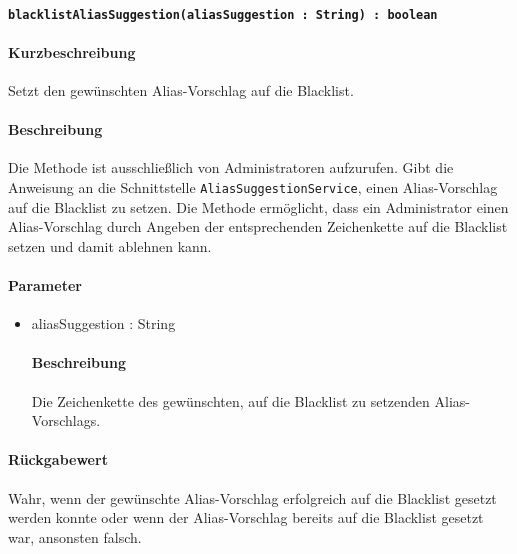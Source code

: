 \paragraph*{\texttt{blacklistAliasSuggestion(aliasSuggestion : String) : boolean}}%
\paragraph*{Kurzbeschreibung}
Setzt den gewünschten Alias-Vorschlag auf die Blacklist.
\paragraph*{Beschreibung}
Die Methode ist ausschließlich von Administratoren aufzurufen.
Gibt die Anweisung an die Schnittstelle \texttt{AliasSuggestionService}, einen Alias-Vorschlag auf die Blacklist zu setzen.
Die Methode ermöglicht, dass ein Administrator einen Alias-Vorschlag durch Angeben der entsprechenden Zeichenkette auf die Blacklist setzen und damit ablehnen kann.
\paragraph*{Parameter}
\begin{itemize}
	\item aliasSuggestion : String
		\paragraph*{Beschreibung}
		Die Zeichenkette des gewünschten, auf die Blacklist zu setzenden Alias-Vorschlags.
\end{itemize}
\paragraph*{Rückgabewert}
Wahr, wenn der gewünschte Alias-Vorschlag erfolgreich auf die Blacklist gesetzt werden konnte oder wenn der Alias-Vorschlag bereits auf die Blacklist gesetzt war, ansonsten falsch.
